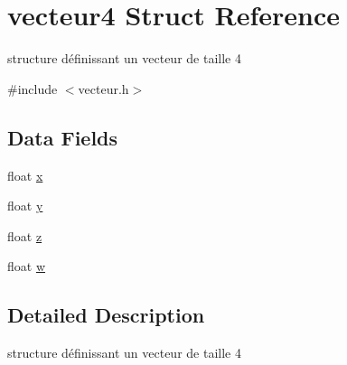 \hypertarget{structvecteur4}{
\section{vecteur4 Struct Reference}
\label{structvecteur4}
}


structure définissant un vecteur de taille 4  




{\ttfamily \#include $<$vecteur.h$>$}

\subsection*{Data Fields}
\begin{DoxyCompactItemize}
\item 
float \hyperlink{structvecteur4_ad0da36b2558901e21e7a30f6c227a45e}{x}
\item 
float \hyperlink{structvecteur4_aa4f0d3eebc3c443f9be81bf48561a217}{y}
\item 
float \hyperlink{structvecteur4_af73583b1e980b0aa03f9884812e9fd4d}{z}
\item 
float \hyperlink{structvecteur4_a56eca241e2896b9f57a79589e76fd24b}{w}
\end{DoxyCompactItemize}


\subsection{Detailed Description}
structure définissant un vecteur de taille 4 

